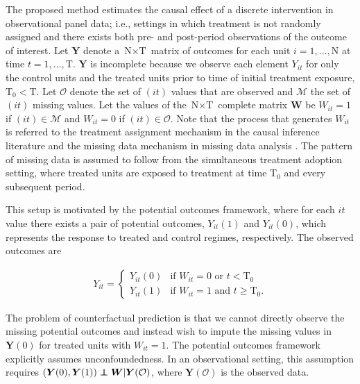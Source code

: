 \documentclass[hidelinks,12pt]{article}
\newcommand\independent{\protect\mathpalette{\protect\independenT}{\perp}}
\def\independenT#1#2{\mathrel{\rlap{$#1#2$}\mkern2mu{#1#2}}}
\begin{document}
The proposed method estimates the causal effect of a discrete intervention in observational panel data; i.e., settings in which treatment is not randomly assigned and there exists both pre- and post-period observations of the outcome of interest. Let $\boldsymbol{Y}$ denote a $\text{N} \times \text{T}$ matrix of outcomes for each unit $i =1, \ldots, \text{N}$ at time $t = 1, \ldots, \text{T}$. $\boldsymbol{Y}$ is incomplete because we observe each element $Y_{it}$ for only the control units and the treated units prior to time of initial treatment exposure, $\text{T}_0 < \text{T}$. Let $\mathcal{O}$ denote the set of $(it)$ values that are observed and $\mathcal{M}$ the set of $(it)$ missing values. Let the values of the $\text{N} \times \text{T}$ complete matrix $\boldsymbol{W}$ be $W_{it} =1$ if $(it) \in \mathcal{M}$ and $W_{it} = 0$ if $(it) \in \mathcal{O}$. Note that the process that generates $W_{it}$ is referred to the treatment assignment mechanism in the causal inference literature \citep{imbens2015causal} and the missing data mechanism in missing data analysis \citep{little2014}. The pattern of missing data is assumed to follow from the simultaneous treatment adoption setting, where treated units are exposed to treatment at time $\text{T}_0$ and every subsequent period. 

This setup is motivated by the \citet{neyman1923} potential outcomes framework, where for each $it$ value there exists a pair of potential outcomes, $Y_{it}(1)$ and $Y_{it}(0)$, which represents the response to treated and control regimes, respectively. The observed outcomes are 

\begin{align} 
Y_{it} = \begin{cases}
Y_{it}(0) 	& \mbox{if } W_{it} = 0  \text{ or } t < \text{T}_0 \\
Y_{it}(1) 	& \mbox{if } W_{it} = 1  \text{ and } t \geq \text{T}_0.
\end{cases} 
\end{align} 

The problem of counterfactual prediction is that we cannot directly observe the missing potential outcomes and instead wish to impute the missing values in $\boldsymbol{Y}(0)$ for treated units with $W_{it} =1$.  The potential outcomes framework explicitly assumes unconfoundedness. In an observational setting, this assumption requires $(\boldsymbol{Y}(0), \boldsymbol{Y}(1)) \independent \boldsymbol{W}| \boldsymbol{Y}(\mathcal{O})$, where $\boldsymbol{Y}(\mathcal{O})$ is the observed data. %
\end{document}
